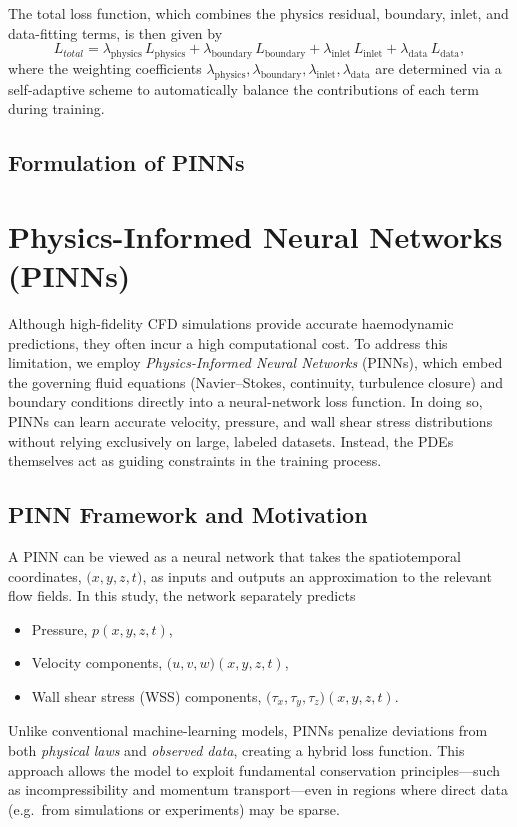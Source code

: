 \documentclass[12pt, a4paper]{article}
\begin{document}
The total loss function, which combines the physics residual, boundary, inlet, and data-fitting terms, is then given by
\[
L_{total} = \lambda_{\mathrm{physics}}\,L_{\mathrm{physics}} + \lambda_{\mathrm{boundary}}\,L_{\mathrm{boundary}} + \lambda_{\mathrm{inlet}}\,L_{\mathrm{inlet}} + \lambda_{\mathrm{data}}\,L_{\mathrm{data}},
\tag{3.2}
\]
where the weighting coefficients \(\lambda_{\mathrm{physics}}, \lambda_{\mathrm{boundary}}, \lambda_{\mathrm{inlet}}, \lambda_{\mathrm{data}}\) are determined via a self-adaptive scheme \citep{mcclenny2020self} to automatically balance the contributions of each term during training.



\subsection{Formulation of PINNs}
\section{Physics-Informed Neural Networks (PINNs)}
\label{sec:PINNs}

Although high-fidelity CFD simulations provide accurate haemodynamic predictions,
they often incur a high computational cost. To address this limitation, we employ
\emph{Physics-Informed Neural Networks} (PINNs), which embed the governing fluid
equations (Navier--Stokes, continuity, turbulence closure) and boundary conditions
directly into a neural-network loss function. In doing so, PINNs can learn
accurate velocity, pressure, and wall shear stress distributions without relying
exclusively on large, labeled datasets. Instead, the PDEs themselves act as
guiding constraints in the training process.

\subsection{PINN Framework and Motivation}
\label{sec:PINN_Framework}

A PINN can be viewed as a neural network that takes the spatiotemporal
coordinates, \(\bigl(x,y,z,t\bigr)\), as inputs and outputs an approximation to
the relevant flow fields. In this study, the network separately predicts
\begin{itemize}
    \item Pressure, \(p(x,y,z,t)\),
    \item Velocity components, \(\bigl(u,v,w\bigr)(x,y,z,t)\),
    \item Wall shear stress (WSS) components, \(\bigl(\tau_x,\tau_y,\tau_z\bigr)(x,y,z,t)\).
\end{itemize}
Unlike conventional machine-learning models, PINNs penalize deviations from
both \emph{physical laws} and \emph{observed data}, creating a hybrid loss
function. This approach allows the model to exploit fundamental conservation
principles---such as incompressibility and momentum transport---even in
regions where direct data (e.g.\ from simulations or experiments) may be sparse.
\end{document}
